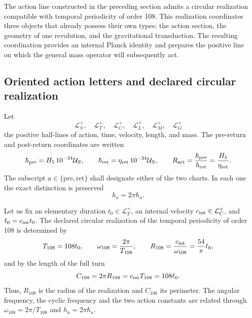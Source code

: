 \label{mdg:sec:identidad-autodual-planck-ct108-rev3}

The action line constructed in the preceding section admits a
circular realization compatible with temporal periodicity of order 108.
This realization coordinates three objects that already possess their own types: the
action section, the geometry of one revolution, and the gravitational
transduction. The resulting coordination provides an internal Planck
identity and prepares the positive line on which the general mass
operator will subsequently act.

\subsection{Oriented action letters and declared circular realization}

Let
\[
 \mathcal L_S^+,\quad \mathcal L_T^+,\quad \mathcal L_C^+,
 \quad \mathcal L_L^+,\quad \mathcal L_M^+,\quad \mathcal L_G^+
\]
the positive half-lines of action, time, velocity, length, and mass.
The pre-return and post-return coordinates are written
\begin{equation}
 \hbar_{\rm pre}=H_5\,10^{-34}\mathcal U_S,
 \qquad
 \hbar_{\rm ret}=\eta_{\rm ret}\,10^{-34}\mathcal U_S,
 \qquad
 R_{\rm act}=\frac{\hbar_{\rm pre}}{\hbar_{\rm ret}}
 =\frac{H_5}{\eta_{\rm ret}}.
 \label{mdg:eq:planck-ct108-cartas-pre-ret-rev3}
\end{equation}
The subscript \(a\in\{\mathrm{pre},\mathrm{ret}\}\) shall designate either
of the two charts. In each one the exact distinction is preserved
\begin{equation}
 h_a=2\pi\hbar_a .
 \label{mdg:eq:planck-ct108-h-hbar-rev3}
\end{equation}

Let us fix an elementary duration \(t_0\in\mathcal L_T^+\), an internal
velocity \(c_{\rm int}\in\mathcal L_C^+\), and
\(\ell_0=c_{\rm int}t_0\). The declared circular realization of the
temporal periodicity of order 108 is determined by
\begin{equation}
 T_{108}=108t_0,
 \qquad
 \omega_{108}=\frac{2\pi}{T_{108}},
 \qquad
 R_{108}=\frac{c_{\rm int}}{\omega_{108}}
 =\frac{54}{\pi}\ell_0,
 \label{mdg:eq:planck-ct108-realizacion-circular-rev3}
\end{equation}
and by the length of the full turn
\begin{equation}
 C_{108}=2\pi R_{108}=c_{\rm int}T_{108}=108\ell_0.
 \label{mdg:eq:planck-ct108-perimetro-rev3}
\end{equation}
Thus, \(R_{108}\) is the radius of the realization and \(C_{108}\) its
perimeter. The angular frequency, the cyclic frequency and the two
action constants are related through
\(\omega_{108}=2\pi/T_{108}\) and \(h_a=2\pi\hbar_a\).


